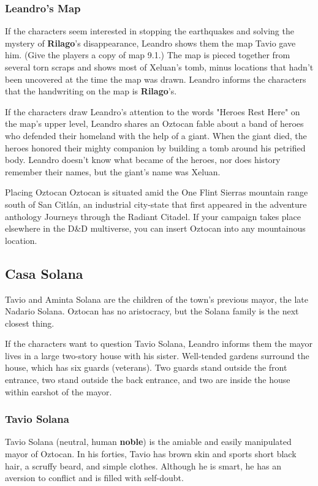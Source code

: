 \documentclass[10pt,a4paper,twoside,bg=print,twocolumn,openany,nodeprecatedcode]{dndbook}
\begin{document}
\subsubsection{Leandro's Map}
If the characters seem interested in stopping the earthquakes and solving the mystery of \textbf{Rilago}'s disappearance, Leandro shows them the map Tavio gave him. (Give the players a copy of map 9.1.) The map is pieced together from several torn scraps and shows most of Xeluan's tomb, minus locations that hadn't been uncovered at the time the map was drawn. Leandro informs the characters that the handwriting on the map is \textbf{Rilago}'s.

If the characters draw Leandro's attention to the words "Heroes Rest Here" on the map's upper level, Leandro shares an Oztocan fable about a band of heroes who defended their homeland with the help of a giant. When the giant died, the heroes honored their mighty companion by building a tomb around his petrified body. Leandro doesn't know what became of the heroes, nor does history remember their names, but the giant's name was Xeluan.

\begin{DndSidebar}[float=!b]{Placing Oztocan}
Oztocan is situated amid the One Flint Sierras mountain range south of San Citlán, an industrial city-state that first appeared in the adventure anthology Journeys through the Radiant Citadel. If your campaign takes place elsewhere in the D\&D multiverse, you can insert Oztocan into any mountainous location.



\end{DndSidebar}

\subsection{Casa Solana}
Tavio and Aminta Solana are the children of the town's previous mayor, the late Nadario Solana. Oztocan has no aristocracy, but the Solana family is the next closest thing.

If the characters want to question Tavio Solana, Leandro informs them the mayor lives in a large two-story house with his sister. Well-tended gardens surround the house, which has six guards (veterans). Two guards stand outside the front entrance, two stand outside the back entrance, and two are inside the house within earshot of the mayor.

\subsubsection{Tavio Solana}
Tavio Solana (neutral, human \textbf{noble}) is the amiable and easily manipulated mayor of Oztocan. In his forties, Tavio has brown skin and sports short black hair, a scruffy beard, and simple clothes. Although he is smart, he has an aversion to conflict and is filled with self-doubt.
\end{document}
